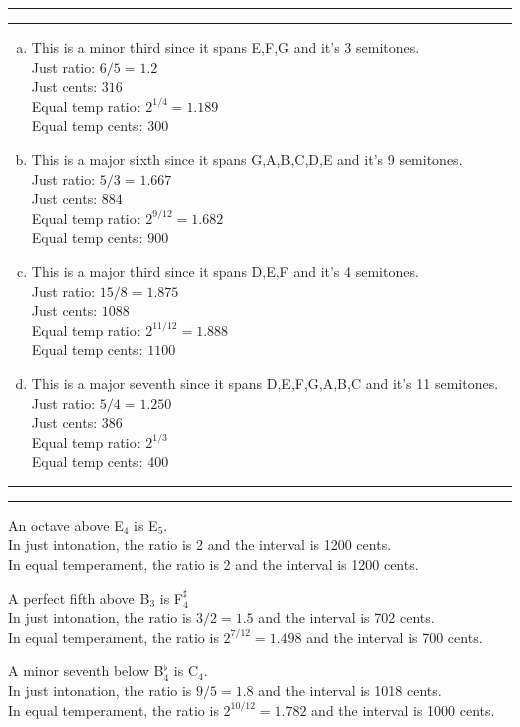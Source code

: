 \documentclass[11pt]{article}
\newcounter{questionCounter}
\newcounter{partCounter}[questionCounter]
\newenvironment{question}[2][\arabic{questionCounter}]{%
    \setcounter{partCounter}{0}%
    \vspace{.25in} \hrule \vspace{0.5em}%
        \noindent{\bf #2}%
    \vspace{0.8em} \hrule \vspace{.10in}%
    \addtocounter{questionCounter}{1}%
}{}
\begin{document}
\begin{question}{Problem 2}
\begin{enumerate}[a)]
\item This is a minor third since it spans E,F,G and it's  3 semitones.\\
Just ratio: $6/5 = 1.2$\\
Just cents: $316$\\
Equal temp ratio: $2^{1/4} = 1.189$\\
Equal temp cents: $300$
\item This is a major sixth since it spans G,A,B,C,D,E and it's 9 semitones.\\
Just ratio: $5/3 = 1.667$\\
Just cents: $884$\\
Equal temp ratio: $2^{9/12} = 1.682$\\
Equal temp cents: $900$
\item This is a major third since it spans D,E,F and it's 4 semitones.\\
Just ratio: $15/8 = 1.875$\\
Just cents: $1088$\\
Equal temp ratio: $2^{11/12} = 1.888$\\
Equal temp cents: $1100$
\item This is a major seventh since it spans D,E,F,G,A,B,C and it's 11 semitones.\\
Just ratio: $5/4 = 1.250$\\
Just cents: $386$\\
Equal temp ratio: $2^{1/3}$\\
Equal temp cents: $400$
\end{enumerate}
\end{question}
\begin{question}{Problem 3}
An octave above E$_4$ is E$_5$.\\
In just intonation, the ratio is 2 and the interval is 1200 cents.\\
In equal temperament, the ratio is 2 and the interval is 1200 cents.

A perfect fifth above B$_3$ is F$_4^{\sharp}$\\
In just intonation, the ratio is $3/2 = 1.5$ and the interval is 702 cents.\\
In equal temperament, the ratio is $2^{7/12} = 1.498$ and the interval is 700 cents.

A minor seventh below B$_4^{\flat}$ is C$_4$.\\
In just intonation, the ratio is $9/5 = 1.8$ and the interval is 1018 cents.\\
In equal temperament, the ratio is $2^{10/12} = 1.782$ and the interval is 1000 cents.
\end{question}
\end{document}

